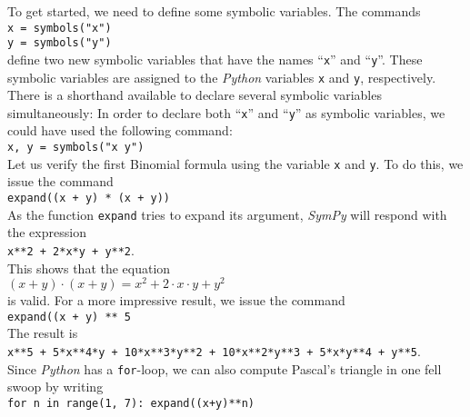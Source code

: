 \documentclass{report}
\begin{document}
To get started, we need to define some symbolic variables.  The commands
\\[0.2cm]
\hspace*{1.3cm}
\texttt{x = symbols("x")} \\
\hspace*{1.3cm}
\texttt{y = symbols("y")}
\\[0.2cm]
define two new symbolic variables that have the names ``\texttt{x}'' and ``\texttt{y}''.  These
symbolic variables are assigned to the \textsl{Python} variables \texttt{x} and \texttt{y},
respectively.  There is a shorthand available to declare several symbolic variables simultaneously:
In order to declare both ``\texttt{x}'' and ``\texttt{y}'' as symbolic variables, we could have used
the following command:
\\[0.2cm]
\hspace*{1.3cm}
\texttt{x, y = symbols("x y")}
\\[0.2cm]
Let us verify the first Binomial formula using the variable \texttt{x} and \texttt{y}.  To do this,
we issue the command
\\[0.2cm]
\hspace*{1.3cm}
\texttt{expand((x + y) * (x + y))}
\\[0.2cm]
As the function \texttt{expand} tries to expand its argument, \textsl{SymPy} will respond with the expression
\\[0.2cm]
\hspace*{1.3cm}
\texttt{x**2 + 2*x*y + y**2}.
\\[0.2cm]
This shows that the equation
\\[0.2cm]
\hspace*{1.3cm}
$(x + y) \cdot (x + y) = x^2 + 2 \cdot x \cdot y + y^2$
\\[0.2cm]
is valid.  For a more impressive result, we issue the command
\\[0.2cm]
\hspace*{1.3cm}
\texttt{expand((x + y) ** 5}
\\[0.2cm]
The result is
\\[0.2cm]
\hspace*{1.3cm}
\texttt{x**5 + 5*x**4*y + 10*x**3*y**2 + 10*x**2*y**3 + 5*x*y**4 + y**5}.
\\[0.2cm]
Since \textsl{Python} has a \texttt{for}-loop, we can also compute Pascal's triangle in one fell
swoop by writing
\\[0.2cm]
\hspace*{1.3cm}
\texttt{for n in range(1, 7): expand((x+y)**n)}
\\[0.2cm]
\end{document}

